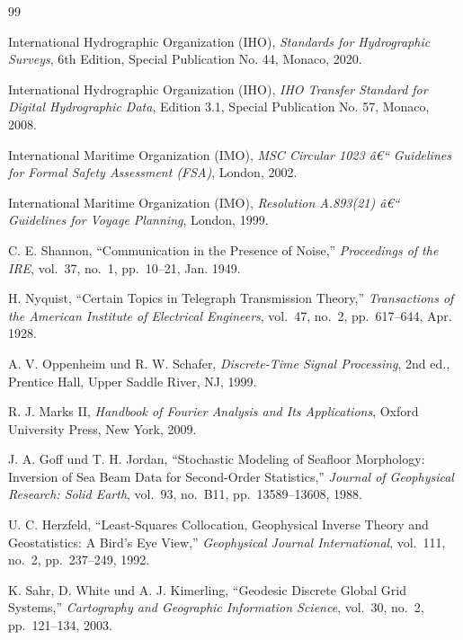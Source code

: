 ﻿\documentclass[a4paper,12pt]{article}
\theoremstyle{definition}
\begin{document}
\begin{thebibliography}{99}

International Hydrographic Organization (IHO),
\textit{Standards for Hydrographic Surveys}, 6th Edition,
Special Publication No. 44, Monaco, 2020.

International Hydrographic Organization (IHO),
\textit{IHO Transfer Standard for Digital Hydrographic Data}, Edition 3.1,
Special Publication No. 57, Monaco, 2008.

International Maritime Organization (IMO),
\textit{MSC Circular 1023 â€“ Guidelines for Formal Safety Assessment (FSA)},
London, 2002.

International Maritime Organization (IMO),
\textit{Resolution A.893(21) â€“ Guidelines for Voyage Planning},
London, 1999.

C. E. Shannon,
``Communication in the Presence of Noise,''
\textit{Proceedings of the IRE}, vol.~37, no.~1, pp.~10--21, Jan. 1949.

H. Nyquist,
``Certain Topics in Telegraph Transmission Theory,''
\textit{Transactions of the American Institute of Electrical Engineers},
vol.~47, no.~2, pp.~617--644, Apr. 1928.

A. V. Oppenheim und R. W. Schafer,
\textit{Discrete-Time Signal Processing}, 2nd ed.,
Prentice Hall, Upper Saddle River, NJ, 1999.

R. J. Marks II,
\textit{Handbook of Fourier Analysis and Its Applications},
Oxford University Press, New York, 2009.

J. A. Goff und T. H. Jordan,
``Stochastic Modeling of Seafloor Morphology: Inversion of Sea Beam Data
for Second-Order Statistics,''
\textit{Journal of Geophysical Research: Solid Earth},
vol.~93, no.~B11, pp.~13589--13608, 1988.

U. C. Herzfeld,
``Least-Squares Collocation, Geophysical Inverse Theory and
Geostatistics: A Bird's Eye View,''
\textit{Geophysical Journal International}, vol.~111, no.~2,
pp.~237--249, 1992.

K. Sahr, D. White und A. J. Kimerling,
``Geodesic Discrete Global Grid Systems,''
\textit{Cartography and Geographic Information Science},
vol.~30, no.~2, pp.~121--134, 2003.


\end{thebibliography}
\end{document}
